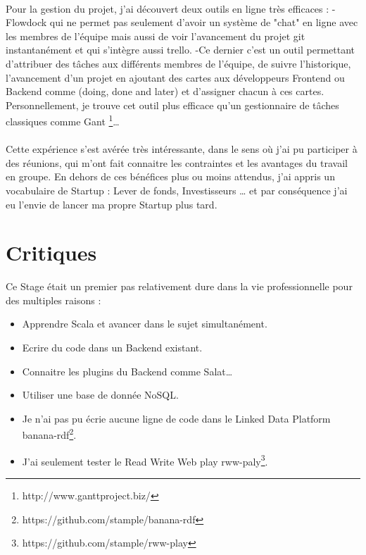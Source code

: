 \documentclass[11pt]{article} %
\begin{document}
\paragraph{}
Pour la gestion du projet, j'ai découvert deux outils en ligne très efficaces :
-Flowdock qui ne permet pas seulement d'avoir un système de "chat" en ligne avec les membres de l'équipe mais aussi de voir l'avancement du projet git instantanément et qui s'intègre aussi trello.
-Ce dernier c'est un outil permettant d'attribuer des tâches aux différents membres de l'équipe, de suivre l'historique, l'avancement d'un projet en ajoutant des cartes aux développeurs Frontend ou Backend comme (doing, done and later) et d'assigner chacun à ces cartes.
Personnellement, je trouve cet outil plus efficace qu'un gestionnaire de tâches classiques comme Gant \footnote{http://www.ganttproject.biz/}…
\paragraph{}
Cette expérience s’est avérée très intéressante, dans le sens où j’ai pu participer à des réunions, qui m’ont fait connaitre les contraintes et les avantages du travail en groupe.
En dehors de ces bénéfices plus ou moins attendus, j'ai appris un vocabulaire de Startup : Lever de fonds, Investisseurs … et par conséquence j'ai eu l'envie de lancer ma propre Startup plus tard.
\section{Critiques}

Ce Stage était un premier pas relativement dure dans la vie professionnelle pour des multiples raisons :
\begin{itemize}
\item Apprendre Scala et avancer dans le sujet simultanément.

\item Ecrire du code dans un Backend existant.

\item Connaitre les plugins du Backend comme Salat…

\item Utiliser une base de donnée NoSQL.

\item Je n'ai pas pu écrie aucune ligne de code dans le Linked Data Platform banana-rdf\footnote{https://github.com/stample/banana-rdf}.

\item J'ai seulement tester le Read Write Web play rww-paly\footnote{https://github.com/stample/rww-play}.



\end{itemize}
\end{document}
